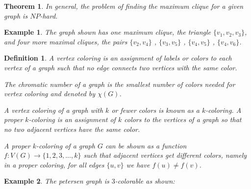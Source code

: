 \documentclass[12pt]{article}
\theoremstyle{slplain}
\newtheorem{theorem}{Theorem}
\newtheorem{defi}{Definition}
\newtheorem{exam}{Example}
\begin{document}
\begin{theorem}
In general, the problem of finding the maximum clique for a given graph is $NP$-hard\cite{karp}.
\end{theorem}

\begin{exam}
The graph shown has one maximum clique, the triangle $\{v_1 , v_2 , v_3\}$, and four more maximal cliques, the pairs 
$\{v_2 , v_4\}$ , $\{v_3 , v_5\}$ , $\{v_4 , v_5\}$ , $\{v_4 , v_6\}$.
\vspace{1cm}
\begin{center}
\end{center}
\end{exam}

\begin{defi}
A vertex coloring is an assignment of labels or colors to each
vertex of a graph such that no edge connects two vertices with the same color.

The chromatic number of a graph is the smallest number of colors needed for
vertex coloring and denoted by $\chi(G)$. 

A vertex coloring of a graph with $k$ or fewer colors is known as a $k$-coloring. A proper $k$-coloring is an assignment of $k$ colors to the vertices of a graph so that no two adjacent vertices have the same color. 

A proper $k$-coloring of a graph $G$ can be shown as a function $f: V(G) \to \{1, 2, 3, . . . , k\}$ such that adjacent vertices get different colors, namely in a proper coloring, for all edges $\{u, v\}$ we have $f(u) \not= f(v)$.
\end{defi}


\begin{exam}
The petersen graph is $3$-colorable as shown:
\vspace{1cm}
\begin{center}
\end{center}

\end{exam}
\vspace{0.5cm}
\end{document}
